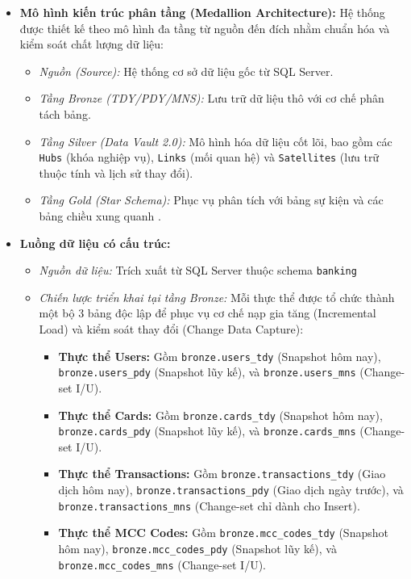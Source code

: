 \begin{itemize}
    \item \textbf{Mô hình kiến trúc phân tầng (Medallion Architecture):} Hệ thống được thiết kế theo mô hình đa tầng từ nguồn đến đích nhằm chuẩn hóa và kiểm soát chất lượng dữ liệu:
    \begin{itemize}
        \item \textit{Nguồn (Source):} Hệ thống cơ sở dữ liệu gốc từ SQL Server.
        \item \textit{Tầng Bronze (TDY/PDY/MNS):} Lưu trữ dữ liệu thô với cơ chế phân tách bảng.
        \item \textit{Tầng Silver (Data Vault 2.0):} Mô hình hóa dữ liệu cốt lõi, bao gồm các \texttt{Hubs} (khóa nghiệp vụ), \texttt{Links} (mối quan hệ) và \texttt{Satellites} (lưu trữ thuộc tính và lịch sử thay đổi).
        \item \textit{Tầng Gold (Star Schema):} Phục vụ phân tích với bảng sự kiện  và các bảng chiều xung quanh .
    \end{itemize}

\item \textbf{Luồng dữ liệu có cấu trúc:}
    \begin{itemize}
        \item \textit{Nguồn dữ liệu:} Trích xuất từ SQL Server thuộc schema \texttt{banking}
        \item \textit{Chiến lược triển khai tại tầng Bronze:} Mỗi thực thể được tổ chức thành một bộ 3 bảng độc lập để phục vụ cơ chế nạp gia tăng (Incremental Load) và kiểm soát thay đổi (Change Data Capture):
        \begin{itemize}
            \item \textbf{Thực thể Users:} Gồm \texttt{bronze.users\_tdy} (Snapshot hôm nay), \texttt{bronze.users\_pdy} (Snapshot lũy kế), và \texttt{bronze.users\_mns} (Change-set I/U).
            \item \textbf{Thực thể Cards:} Gồm \texttt{bronze.cards\_tdy} (Snapshot hôm nay), \texttt{bronze.cards\_pdy} (Snapshot lũy kế), và \texttt{bronze.cards\_mns} (Change-set I/U).
            \item \textbf{Thực thể Transactions:} Gồm \texttt{bronze.transactions\_tdy} (Giao dịch hôm nay), \texttt{bronze.transactions\_pdy} (Giao dịch ngày trước), và \texttt{bronze.transactions\_mns} (Change-set chỉ dành cho Insert).
            \item \textbf{Thực thể MCC Codes:} Gồm \texttt{bronze.mcc\_codes\allowbreak\_tdy} (Snapshot hôm nay), \texttt{bronze.mcc\_codes\allowbreak\_pdy} (Snapshot lũy kế), và  \newline  \texttt{bronze.mcc\_codes\allowbreak\_mns} (Change-set I/U).
        \end{itemize}
    \end{itemize}


\end{itemize}
